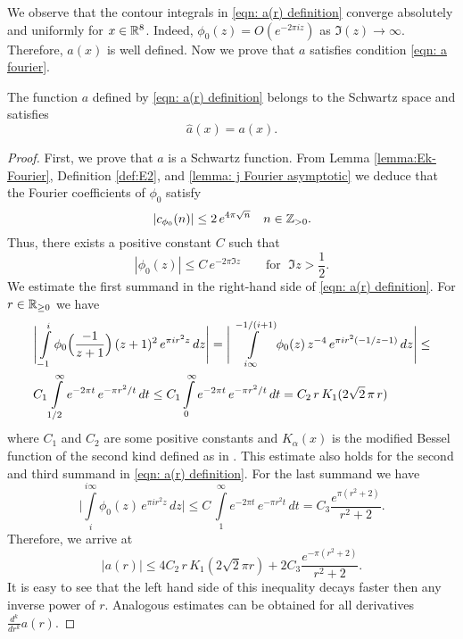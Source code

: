 We observe that the contour integrals in \eqref{eqn: a(r) definition} converge absolutely and uniformly for  $x\in\mathbb{R}^8$. Indeed,
$\phi_0(z)=O(e^{-2\pi i z})$ as $\Im(z)\to \infty$. Therefore, $a(x)$ is well defined. Now we prove that $a$ satisfies condition \eqref{eqn: a fourier}.
\begin{proposition}\label{prop: a(r) Fourier}

The function $a$ defined by \eqref{eqn: a(r) definition} belongs to the Schwartz space and satisfies $$\widehat{a}(x)=a(x). $$
\end{proposition}
\begin{proof}
First, we prove that $a$ is a Schwartz function. From Lemma \ref{lemma:Ek-Fourier}, Definition \ref{def:E2}, and \ref{lemma: j Fourier asymptotic} we deduce that the Fourier coefficients of $\phi_0$ satisfy
$$|c_{\phi_0}(n)|\leq2\,e^{4\pi\sqrt{n}}\quad n\in\mathbb{Z}_{>0}.$$ Thus, there exists a positive constant $C$ such that
$$|\phi_0(z)|\leq C\,e^{-2\pi \Im{z}}\qquad \mbox{for } \; \Im{z}>\frac 12.$$
We estimate the first summand in the right-hand side of \eqref{eqn: a(r) definition}.  For $r\in\mathbb{R}_{\geq 0}$ we have
\begin{align}&\Bigg|\int\limits_{-1}^{i}\phi_0\Big(\frac{-1}{z+1}\Big)\,(z+1)^2\,e^{\pi i r^2 z}\,dz\Bigg|=\Bigg|\int\limits_{i\infty}^{-1/(i+1)}\phi_0(z)\,z^{-4}\,e^{\pi i r^2 (-1/z-1)}\,dz\Bigg|\leq \notag\\
  &C_1\int\limits_{1/2}^{\infty}e^{-2\pi t}\,e^{-\pi  r^2/t}\,dt\leq C_1\int\limits_{0}^{\infty}e^{-2\pi t}\,e^{-\pi  r^2/t}\,dt=C_2\,r\,K_1(2\sqrt{2}\,\pi\,r)\notag
\end{align}
where $C_1$ and $C_2$ are some positive constants and $K_\alpha(x)$ is the modified Bessel function of the second kind defined as in \cite[Section~9.6]{Abramowitz}. This estimate also holds for the second and third summand in \eqref{eqn: a(r) definition}.
For the last summand we have
$$ \Bigg|\int\limits_{i}^{i\infty}\phi_0(z)\,e^{\pi i r^2 z}\,dz\Bigg|\leq C\,\int\limits_{1}^{\infty} e^{-2\pi t}\,e^{-\pi r^2 t}\,dt=C_3\frac{e^{\pi(r^2+2)}}{r^2+2}.$$
Therefore, we arrive at
$$|a(r)|\leq 4C_2\,r\,K_1(2\sqrt{2}\pi r)+2C_3\frac{e^{-\pi(r^2+2)}}{r^2+2}.$$
It is easy to see that the left hand side of this inequality decays faster then any inverse power of $r$. Analogous estimates can be obtained for all derivatives $\frac{d^k}{dr^k}a(r)$.


\end{proof}
